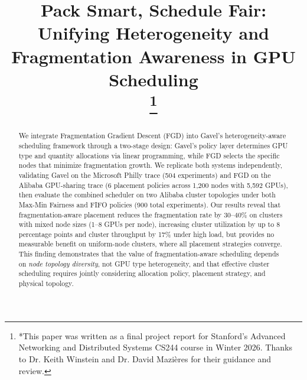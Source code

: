 \documentclass[conference]{IEEEtran}
\begin{document}
\title{Pack Smart, Schedule Fair: Unifying Heterogeneity and Fragmentation Awareness in GPU Scheduling\\
\thanks{*This paper was written as a final project report for Stanford's Advanced Networking and Distributed Systems CS244 course in Winter 2026.
Thanks to Dr. Keith Winstein and Dr. David Mazi\`eres for their guidance and review.}
}

\author{
\and
{}
\and
{}
\and
{}
}

\maketitle

\begin{abstract}
We integrate Fragmentation Gradient Descent (FGD) into Gavel's heterogeneity-aware scheduling framework through a two-stage design: Gavel's policy layer determines GPU type and quantity allocations via linear programming, while FGD selects the specific nodes that minimize fragmentation growth.
We replicate both systems independently, validating Gavel on the Microsoft Philly trace (504 experiments) and FGD on the Alibaba GPU-sharing trace (6 placement policies across 1,200 nodes with 5,592 GPUs), then evaluate the combined scheduler on two Alibaba cluster topologies under both Max-Min Fairness and FIFO policies (900 total experiments).
Our results reveal that fragmentation-aware placement reduces the fragmentation rate by 30--40\% on clusters with mixed node sizes (1--8 GPUs per node), increasing cluster utilization by up to 8 percentage points and cluster throughput by 17\% under high load, but provides no measurable benefit on uniform-node clusters, where all placement strategies converge.
This finding demonstrates that the value of fragmentation-aware scheduling depends on \textit{node topology diversity}, not GPU type heterogeneity, and that effective cluster scheduling requires jointly considering allocation policy, placement strategy, and physical topology.
\end{abstract}
\end{document}
